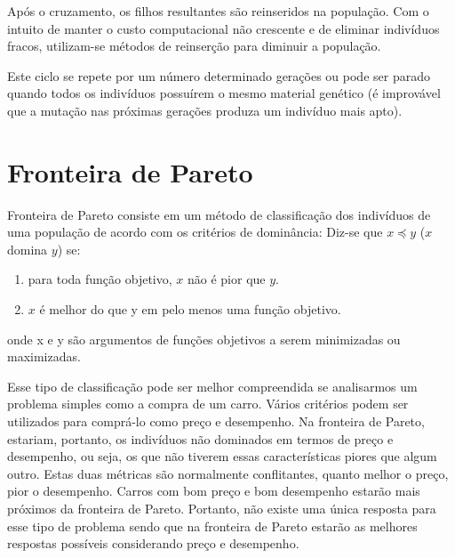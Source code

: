 \documentclass[12pt, %
openright, 
oneside, %
a4paper,    %
brazil]{facom-ufu-abntex2}
\begin{document}
	Após o cruzamento, os filhos resultantes são reinseridos na população. Com o intuito de manter o custo computacional não crescente e de eliminar indivíduos fracos, utilizam-se métodos de reinserção para diminuir a população.
	
	Este ciclo se repete por um número determinado gerações ou pode ser parado quando todos os indivíduos possuírem o mesmo material genético (é improvável que a mutação nas próximas gerações produza um indivíduo mais apto).
    
\section{Fronteira de Pareto}
	Fronteira de Pareto\cite{Pareto} consiste em um método de classificação dos indivíduos de uma população de acordo com  os critérios de dominância:
    Diz-se que $x \preceq y$ ($x$ domina $y$) se:
	
	\begin{enumerate}
		\item para toda função objetivo, $x$ não é pior que $y$.
		
		\item $x$ é melhor do que y em pelo menos uma função objetivo.
	\end{enumerate}
	onde x e y são argumentos de funções objetivos a serem minimizadas ou maximizadas.
    
    Esse tipo de classificação pode ser melhor compreendida se analisarmos um problema simples como a compra de um carro. Vários critérios podem ser utilizados para comprá-lo como preço e desempenho. Na fronteira de Pareto, estariam, portanto, os indivíduos não dominados em termos de preço e desempenho, ou seja, os que  não tiverem essas características piores que algum outro. Estas duas métricas são normalmente conflitantes, quanto melhor o preço, pior o desempenho. Carros com bom preço e bom desempenho estarão mais próximos da fronteira de Pareto. Portanto, não existe uma única resposta para esse tipo de problema sendo que na fronteira de Pareto estarão as melhores respostas possíveis considerando preço e desempenho.
	
\end{document}
